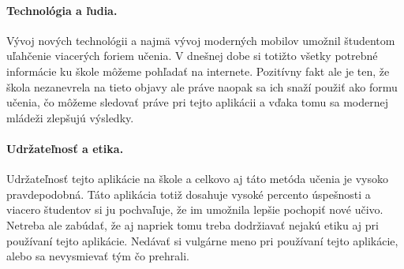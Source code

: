 \documentclass[10pt,oneside,slovak,a4paper]{article}
\begin{document}
\paragraph{Technológia a ľudia.}
Vývoj nových technológii a najmä vývoj moderných mobilov umožnil študentom uľahčenie viacerých foriem učenia. V dnešnej dobe si totižto všetky potrebné informácie ku škole môžeme pohľadať na internete. Pozitívny fakt ale je ten, že škola nezanevrela na tieto objavy ale práve naopak sa ich  snaží použiť ako formu učenia, čo môžeme sledovať práve pri tejto aplikácii a vďaka tomu sa modernej mládeži zlepšujú výsledky.  
\paragraph{Udržateľnosť a etika.}
Udržateľnosť tejto aplikácie na škole a celkovo aj táto metóda učenia je vysoko pravdepodobná. Táto aplikácia totiž dosahuje vysoké percento úspešnosti a viacero študentov si ju pochvaľuje, že im umožnila lepšie pochopiť nové učivo. Netreba ale zabúdať, že aj napriek tomu treba dodržiavať nejakú etiku aj pri používaní tejto aplikácie. Nedávať si vulgárne meno pri používaní tejto aplikácie, alebo sa nevysmievať tým čo prehrali. 





\end{document}
